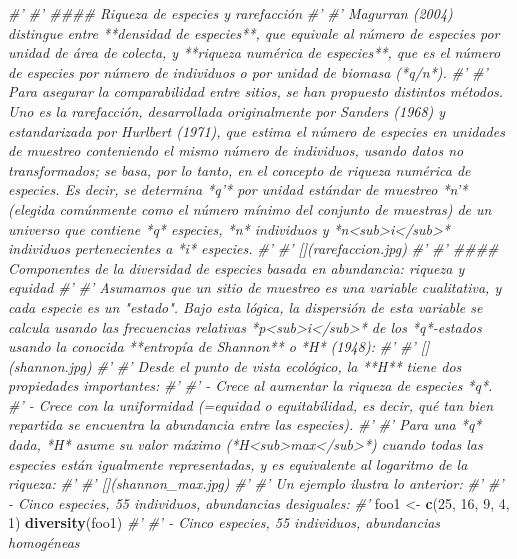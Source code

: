 \documentclass[11pt,]{article}
\newenvironment{Shaded}{\begin{snugshade}}{\end{snugshade}}
\newcommand{\KeywordTok}[1]{\textcolor[rgb]{0.13,0.29,0.53}{\textbf{#1}}}
\newcommand{\DecValTok}[1]{\textcolor[rgb]{0.00,0.00,0.81}{#1}}
\newcommand{\StringTok}[1]{\textcolor[rgb]{0.31,0.60,0.02}{#1}}
\newcommand{\CommentTok}[1]{\textcolor[rgb]{0.56,0.35,0.01}{\textit{#1}}}
\newcommand{\NormalTok}[1]{#1}
\begin{document}
\begin{Shaded}
\begin{Highlighting}[]
{\CommentTok{#' }
\CommentTok{#' #### Riqueza de especies y rarefacción}
\CommentTok{#' }
\CommentTok{#' Magurran (2004) distingue entre **densidad de especies**, que equivale al número de especies por unidad de área de colecta, y **riqueza numérica de especies**, que es el número de especies por número de individuos o por unidad de biomasa (*q/n*).}
\CommentTok{#' }
\CommentTok{#' Para asegurar la comparabilidad entre sitios, se han propuesto distintos métodos. Uno es la rarefacción, desarrollada originalmente por Sanders (1968) y estandarizada por Hurlbert (1971), que estima el número de especies en unidades de muestreo conteniendo el mismo número de individuos, usando datos no transformados; se basa, por lo tanto, en el concepto de riqueza numérica de especies. Es decir, se determina *q'* por unidad estándar de muestreo *n'* (elegida comúnmente como el número mínimo del conjunto de muestras) de un universo que contiene *q* especies, *n* individuos y *n<sub>i</sub>* individuos pertenecientes a *i* especies.}
\CommentTok{#' }
\CommentTok{#' [](rarefaccion.jpg)}
\CommentTok{#' }
\CommentTok{#' #### Componentes de la diversidad de especies basada en abundancia: riqueza y equidad}
\CommentTok{#' }
\CommentTok{#' Asumamos que un sitio de muestreo es una variable cualitativa, y cada especie es un "estado". Bajo esta lógica, la dispersión de esta variable se calcula usando las frecuencias relativas *p<sub>i</sub>* de los *q*-estados usando la conocida **entropía de Shannon** o *H* (1948):}
\CommentTok{#' }
\CommentTok{#' [](shannon.jpg)}
\CommentTok{#' }
\CommentTok{#' Desde el punto de vista ecológico, la **H** tiene dos propiedades importantes:}
\CommentTok{#' }
\CommentTok{#' - Crece al aumentar la riqueza de especies *q*.}
\CommentTok{#' - Crece con la uniformidad (=equidad o equitabilidad, es decir, qué tan bien repartida se encuentra la abundancia entre las especies).}
\CommentTok{#' }
\CommentTok{#' Para una *q* dada, *H* asume su valor máximo (*H<sub>max</sub>*) cuando todas las especies están igualmente representadas, y es equivalente al logaritmo de la riqueza:}
\CommentTok{#' }
\CommentTok{#' [](shannon_max.jpg)}
\CommentTok{#' }
\CommentTok{#' Un ejemplo ilustra lo anterior:}
\CommentTok{#' }
\CommentTok{#' - Cinco especies, 55 individuos, abundancias desiguales:}
\CommentTok{#' }
\NormalTok{foo1 <-}\StringTok{ }\KeywordTok{c}\NormalTok{(}\DecValTok{25}\NormalTok{, }\DecValTok{16}\NormalTok{, }\DecValTok{9}\NormalTok{, }\DecValTok{4}\NormalTok{, }\DecValTok{1}\NormalTok{)}
\KeywordTok{diversity}\NormalTok{(foo1)}
\CommentTok{#' }
\CommentTok{#' - Cinco especies, 55 individuos, abundancias homogéneas}
}
\end{Highlighting}
\end{Shaded}
\end{document}

